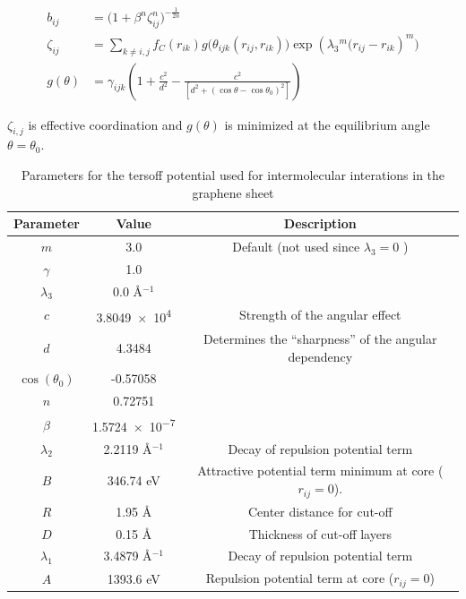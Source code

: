 \begin{align*}
  b_{i j} & =\big(1+\beta^n \zeta_{i j}^n\big)^{-\frac{1}{2 n}} \\
  \zeta_{i j} & =\sum_{k \ne i,j} f_C(r_{i k}) g\Big(\theta_{i j k}\left(r_{i j}, r_{i k}\right)\Big) \exp \left(\lambda_3{ }^m\big(r_{i j}-r_{i k}\right)^m\big) \\
  g(\theta) & =\gamma_{i j k}\left(1+\frac{c^2}{d^2}-\frac{c^2}{\left[d^2+\left(\cos \theta-\cos \theta_0\right)^2\right]}\right)
\end{align*}

$\zeta_{i,j}$ is effective coordination and $g(\theta)$ is minimized at the equilibrium angle $\theta = \theta_0$.




\begin{table}[H]
  \begin{center}
  \caption{Parameters for the tersoff potential used for intermolecular interations in the graphene sheet}
  \label{tab:param}
  \begin{tabular}{ | c | c | c|} \hline
    Parameter & Value & Description \\ \hline 
    $m$ & 3.0 & Default (not used since $\lambda_3 = 0$ ) \\ \hline
    $\gamma$ & 1.0 & \\ \hline
    $\lambda_3$ & 0.0 Å$^{-1}$ & \\ \hline
    $c$ & \num{3.8049e4} & Strength of the angular effect \\ \hline
    $d$ & 4.3484 & Determines the ``sharpness'' of the angular dependency \\ \hline
    $\cos{(\theta_0)}$ & -0.57058  & \\ \hline
    $n$ & 0.72751 & \\ \hline
    $\beta$ & \num{1.5724e-7} & \\ \hline
    $\lambda_2$ & 2.2119 Å$^{-1}$ & Decay of repulsion potential term \\ \hline
    $B$ & 346.74 eV & Attractive potential term minimum at core ($ r_{ij} = 0$).  \\ \hline
    $R$ & 1.95 Å & Center distance for cut-off \\ \hline
    $D$  & 0.15 Å & Thickness of cut-off layers \\ \hline
    $\lambda_1$ & 3.4879 Å$^{-1}$ & Decay of repulsion potential term \\ \hline
    $A$ & 1393.6 eV & Repulsion potential term at core ($ r_{ij} = 0$) \\ \hline
  \end{tabular}
  \end{center}
\end{table}


